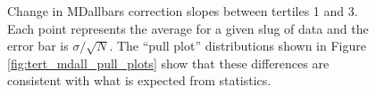 \begin{figure}[ht]

\centering
{}
\caption{Change in MDallbars correction slopes between tertiles 1 and 3. Each point represents the average for a given slug of data and the error bar is $\sigma/\sqrt{N}$. The ``pull plot'' distributions shown in Figure \ref{fig:tert_mdall_pull_plots} show that these differences are consistent with what is expected from statistics.}
\label{fig:tert_mdall_slope change}
\end{figure}

